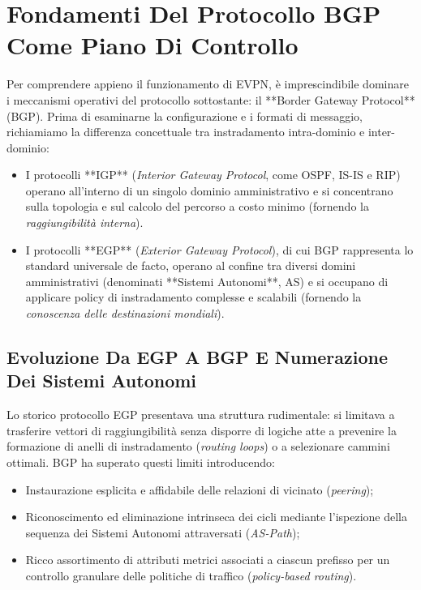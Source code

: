 \documentclass[11pt, a4paper]{article}
\begin{document}
\newpage


\section{Fondamenti Del Protocollo BGP Come Piano Di Controllo}

Per comprendere appieno il funzionamento di EVPN, è imprescindibile dominare i meccanismi operativi del protocollo sottostante: il **Border Gateway Protocol** (BGP). Prima di esaminarne la configurazione e i formati di messaggio, richiamiamo la differenza concettuale tra instradamento intra-dominio e inter-dominio:
\begin{itemize}[noitemsep]
    \item I protocolli **IGP** (\emph{Interior Gateway Protocol}, come OSPF, IS-IS e RIP) operano all'interno di un singolo dominio amministrativo e si concentrano sulla topologia e sul calcolo del percorso a costo minimo (fornendo la \emph{raggiungibilità interna}).
    \item I protocolli **EGP** (\emph{Exterior Gateway Protocol}), di cui BGP rappresenta lo standard universale de facto, operano al confine tra diversi domini amministrativi (denominati **Sistemi Autonomi**, AS) e si occupano di applicare policy di instradamento complesse e scalabili (fornendo la \emph{conoscenza delle destinazioni mondiali}).
\end{itemize}


\subsection{Evoluzione Da EGP A BGP E Numerazione Dei Sistemi Autonomi}

Lo storico protocollo EGP presentava una struttura rudimentale: si limitava a trasferire vettori di raggiungibilità senza disporre di logiche atte a prevenire la formazione di anelli di instradamento (\emph{routing loops}) o a selezionare cammini ottimali. BGP ha superato questi limiti introducendo:
\begin{itemize}[noitemsep]
    \item Instaurazione esplicita e affidabile delle relazioni di vicinato (\emph{peering});
    \item Riconoscimento ed eliminazione intrinseca dei cicli mediante l'ispezione della sequenza dei Sistemi Autonomi attraversati (\emph{AS-Path});
    \item Ricco assortimento di attributi metrici associati a ciascun prefisso per un controllo granulare delle politiche di traffico (\emph{policy-based routing}).
\end{itemize}
\end{document}
